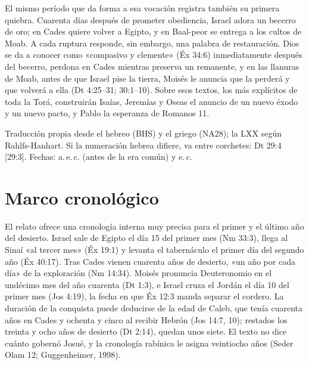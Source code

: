 El mismo período que da forma a esa vocación registra también su primera quiebra. Cuarenta días después de prometer obediencia, Israel adora un becerro de oro; en Cades quiere volver a Egipto, y en Baal-peor se entrega a los cultos de Moab. A cada ruptura responde, sin embargo, una palabra de restauración. Dios se da a conocer como «compasivo y clemente» (Éx 34:6) inmediatamente después del becerro, perdona en Cades mientras preserva un remanente, y en las llanuras de Moab, antes de que Israel pise la tierra, Moisés le anuncia que la perderá y que volverá a ella (Dt 4:25–31; 30:1–10). Sobre esos textos, los más explícitos de toda la Torá, construirán Isaías, Jeremías y Oseas el anuncio de un nuevo éxodo y un nuevo pacto, y Pablo la esperanza de Romanos 11.

\begin{nota}
Traducción propia desde el hebreo (BHS) y el griego (NA28); la LXX según Rahlfs-Hanhart. Si la numeración hebrea difiere, va entre corchetes: Dt 29:4 [29:3]. Fechas: a.\,e.\,c. (antes de la era común) y e.\,c.
\end{nota}

\section{Marco cronológico}

El relato ofrece una cronología interna muy precisa para el primer y el último año del desierto. Israel sale de Egipto el día 15 del primer mes (Nm 33:3), llega al Sinaí «al tercer mes» (Éx 19:1) y levanta el tabernáculo el primer día del segundo año (Éx 40:17). Tras Cades vienen cuarenta años de desierto, «un año por cada día» de la exploración (Nm 14:34). Moisés pronuncia Deuteronomio en el undécimo mes del año cuarenta (Dt 1:3), e Israel cruza el Jordán el día 10 del primer mes (Jos 4:19), la fecha en que Éx 12:3 manda separar el cordero. La duración de la conquista puede deducirse de la edad de Caleb, que tenía cuarenta años en Cades y ochenta y cinco al recibir Hebrón (Jos 14:7, 10); restados los treinta y ocho años de desierto (Dt 2:14), quedan unos siete. El texto no dice cuánto gobernó Josué, y la cronología rabínica le asigna veintiocho años (Seder Olam 12; Guggenheimer, 1998).

